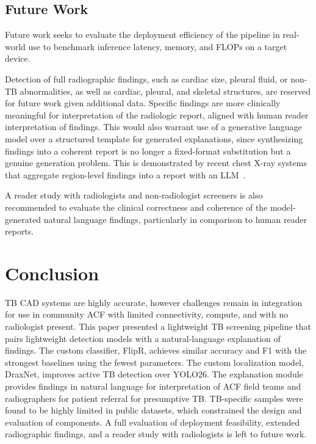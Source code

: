 \documentclass[conference, letterpaper]{IEEEtran}
\begin{document}
\subsection{Future Work}

Future work seeks to evaluate the deployment efficiency of the pipeline in real-world use to benchmark inference latency, memory, and FLOPs on a target device.

Detection of full radiographic findings, such as cardiac size, pleural fluid, or non-TB abnormalities, as well as cardiac, pleural, and skeletal structures, are reserved for future work given additional data. Specific findings are more clinically meaningful for interpretation of the radiologic report, aligned with human reader interpretation of findings. This would also warrant use of a generative language model over a structured template for generated explanations, since synthesizing findings into a coherent report is no longer a fixed-format substitution but a genuine generation problem. This is demonstrated by recent chest X-ray systems that aggregate region-level findings into a report with an LLM~\cite{siemens_llm_cxr_2023, noh2026hybrid}.

A reader study with radiologists and non-radiologist screeners is also recommended to evaluate the clinical correctness and coherence of the model-generated natural language findings, particularly in comparison to human reader reports.

\section{Conclusion}

TB CAD systems are highly accurate, however challenges remain in integration for use in community ACF with limited connectivity, compute, and with no radiologist present. This paper presented a lightweight TB screening pipeline that pairs lightweight detection models with a natural-language explanation of findings. The custom classifier, FlipR, achieves similar accuracy and F1 with the strongest baselines using the fewest parameters. The custom localization model, DraxNet, improves active TB detection over YOLO26. The explanation module provides findings in natural language for interpretation of ACF field teams and radiographers for patient referral for presumptive TB. TB-specific samples were found to be highly limited in public datasets, which constrained the design and evaluation of components. A full evaluation of deployment feasibility, extended radiographic findings, and a reader study with radiologists is left to future work.
\end{document}
